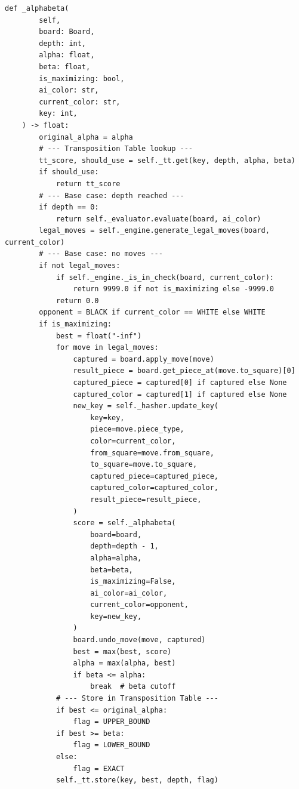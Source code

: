 \documentclass[a4paper,11pt]{article}
\begin{document}
\begin{verbatim}
def _alphabeta(
        self,
        board: Board,
        depth: int,
        alpha: float,
        beta: float,
        is_maximizing: bool,
        ai_color: str,
        current_color: str,
        key: int,
    ) -> float:
        original_alpha = alpha
        # --- Transposition Table lookup ---
        tt_score, should_use = self._tt.get(key, depth, alpha, beta)
        if should_use:
            return tt_score
        # --- Base case: depth reached ---
        if depth == 0:
            return self._evaluator.evaluate(board, ai_color)
        legal_moves = self._engine.generate_legal_moves(board, current_color)
        # --- Base case: no moves ---
        if not legal_moves:
            if self._engine._is_in_check(board, current_color):
                return 9999.0 if not is_maximizing else -9999.0
            return 0.0
        opponent = BLACK if current_color == WHITE else WHITE
        if is_maximizing:
            best = float("-inf")
            for move in legal_moves:
                captured = board.apply_move(move)
                result_piece = board.get_piece_at(move.to_square)[0]
                captured_piece = captured[0] if captured else None
                captured_color = captured[1] if captured else None
                new_key = self._hasher.update_key(
                    key=key,
                    piece=move.piece_type,
                    color=current_color,
                    from_square=move.from_square,
                    to_square=move.to_square,
                    captured_piece=captured_piece,
                    captured_color=captured_color,
                    result_piece=result_piece,
                )
                score = self._alphabeta(
                    board=board,
                    depth=depth - 1,
                    alpha=alpha,
                    beta=beta,
                    is_maximizing=False,
                    ai_color=ai_color,
                    current_color=opponent,
                    key=new_key,
                )
                board.undo_move(move, captured)
                best = max(best, score)
                alpha = max(alpha, best)
                if beta <= alpha:
                    break  # beta cutoff
            # --- Store in Transposition Table ---
            if best <= original_alpha:
                flag = UPPER_BOUND
            if best >= beta:
                flag = LOWER_BOUND
            else:
                flag = EXACT
            self._tt.store(key, best, depth, flag)

\end{verbatim}
\end{document}
